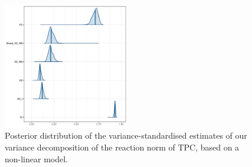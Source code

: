 \documentclass[a4paper,12pt,twoside]{article}
\begin{document}
\begin{figure}[h!t!]
  \includegraphics[width = 0.49\textwidth]{TPC_varstd_ct.pdf}
  \caption{Posterior distribution of the variance-standardised estimates of our variance decomposition of the reaction norm of TPC, based on a non-linear model.}
  \label{fig_agr_var_decomp_ct}
\end{figure}

\begin{multicols}{2}
  \begin{singlespace}
    \small
    \printbibliography
  \end{singlespace}
\end{multicols}
\end{document}
